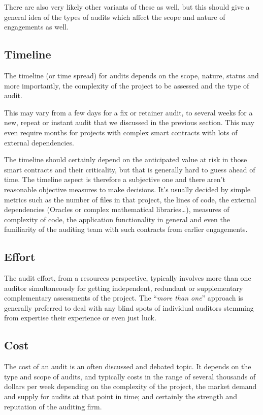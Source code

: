 There are also very likely other variants of these as well, but this
should give a general idea of the types of audits which affect the scope
and nature of engagements as well.

\subsection{Timeline}\label{timeline}

The timeline (or time spread) for audits depends on the scope, nature,
status and more importantly, the complexity of the project to be
assessed and the type of audit.

This may vary from a few days for a fix or retainer audit, to several
weeks for a new, repeat or instant audit that we discussed in the
previous section. This may even require months for projects with complex
smart contracts with lots of external dependencies.

The timeline should certainly depend on the anticipated value at risk in
those smart contracts and their criticality, but that is generally hard
to guess ahead of time. The timeline aspect is therefore a subjective
one and there aren't reasonable objective measures to make decisions.
It's usually decided by simple metrics such as the number of files in
that project, the lines of code, the external dependencies (Oracles or
complex mathematical libraries\ldots), measures of complexity of code,
the application functionality in general and even the familiarity of the
auditing team with such contracts from earlier engagements.

\subsection{Effort}\label{effort}

The audit effort, from a resources perspective, typically involves more
than one auditor simultaneously for getting independent, redundant or
supplementary complementary assessments of the project. The ``\emph{more
than one}'' approach is generally preferred to deal with any blind spots
of individual auditors stemming from expertise their experience or even
just luck.

\subsection{Cost}\label{cost}

The cost of an audit is an often discussed and debated topic. It depends
on the type and scope of audits, and typically costs in the range of
several thousands of dollars per week depending on the complexity of the
project, the market demand and supply for audits at that point in time;
and certainly the strength and reputation of the auditing firm.

